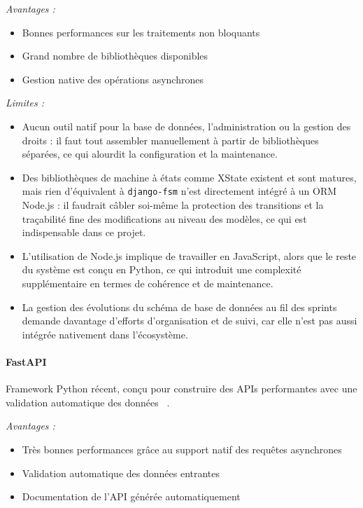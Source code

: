 \textit{Avantages :}
\begin{itemize}
  \item Bonnes performances sur les traitements
        non bloquants
  \item Grand nombre de bibliothèques disponibles
  \item Gestion native des opérations asynchrones
\end{itemize}

\textit{Limites :}
\begin{itemize}
    \item Aucun outil natif pour la base de données, l'administration ou la gestion des droits : il faut tout assembler manuellement à partir de bibliothèques séparées, ce qui alourdit la configuration et la maintenance.
    \item Des bibliothèques de machine à états comme XState existent et sont matures, mais rien d'équivalent à \texttt{django-fsm} n'est directement intégré à un ORM Node.js : il faudrait câbler soi-même la protection des transitions et la traçabilité fine des modifications au niveau des modèles, ce qui est indispensable dans ce projet.
    \item L'utilisation de Node.js implique de travailler en JavaScript, alors que le reste du système est conçu en Python, ce qui introduit une complexité supplémentaire en termes de cohérence et de maintenance.
    \item La gestion des évolutions du schéma de base de données au fil des sprints demande davantage d'efforts d'organisation et de suivi, car elle n'est pas aussi intégrée nativement dans l'écosystème.
\end{itemize}

\paragraph{FastAPI}
Framework Python récent, conçu pour construire
des APIs performantes avec une validation
automatique des données ~\cite{fastapi_dev}.

\textit{Avantages :}
\begin{itemize}
  \item Très bonnes performances grâce
        au support natif des requêtes asynchrones
  \item Validation automatique des données entrantes
  \item Documentation de l'API générée automatiquement
\end{itemize}

